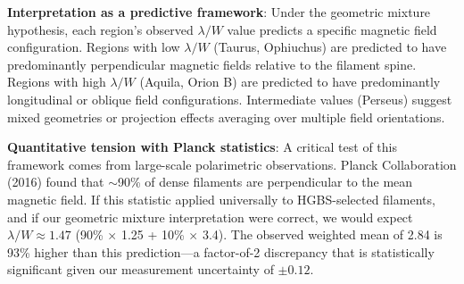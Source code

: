 \documentclass[twoside,twocolumn]{mnras}
\begin{document}
\textbf{Interpretation as a predictive framework}: Under the geometric mixture hypothesis, each region's observed $\lambda/W$ value predicts a specific magnetic field configuration. Regions with low $\lambda/W$ (Taurus, Ophiuchus) are predicted to have predominantly perpendicular magnetic fields relative to the filament spine. Regions with high $\lambda/W$ (Aquila, Orion B) are predicted to have predominantly longitudinal or oblique field configurations. Intermediate values (Perseus) suggest mixed geometries or projection effects averaging over multiple field orientations.

\textbf{Quantitative tension with Planck statistics}: A critical test of this framework comes from large-scale polarimetric observations. Planck Collaboration (2016) found that $\sim$90\% of dense filaments are perpendicular to the mean magnetic field. If this statistic applied universally to HGBS-selected filaments, and if our geometric mixture interpretation were correct, we would expect $\lambda/W \approx 1.47$ (90\% $\times$ 1.25 + 10\% $\times$ 3.4). The observed weighted mean of 2.84 is 93\% higher than this prediction---a factor-of-2 discrepancy that is statistically significant given our measurement uncertainty of $\pm 0.12$.
\end{document}
